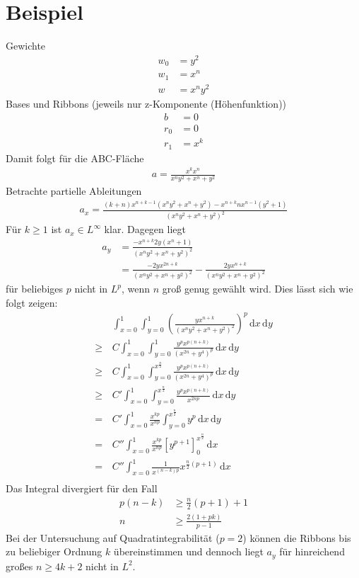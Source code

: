 \documentclass[10pt,a4paper]{report}
\author{Ludwig Paul Lind}
\begin{document}
\chapter{Beispiel}
Gewichte
\begin{align*}
w_0 &= y^2 \\
w_1 &= x^n \\
w &= x^n y^2
\end{align*}
Bases und Ribbons (jeweils nur z-Komponente (Höhenfunktion))
\begin{align*}
b &= 0 \\
r_0 &= 0 \\
r_1 &= x^k
\end{align*}
Damit folgt für die ABC-Fläche
\begin{align*}
a = \frac{x^k x^n}{x^n y^2 + x^n + y^2}
\end{align*}
Betrachte partielle Ableitungen
\begin{align*}
a_x = \frac{\left(k+n\right) x^{n+k-1} \left( x^ny^2+x^n+y^2\right) - x^{n+k} n x^{n-1} \left(y^2 + 1\right)}{\left(x^ny^2+x^n+y^2\right)^2}
\end{align*}
Für $k \geq 1$ ist $a_x \in L^{\infty}$ klar.
Dagegen liegt 
\begin{align*}
a_y &= \frac{-x^{n+k} 2 y \left(x^n + 1\right)}{\left(x^ny^2+x^n+y^2\right)^2} \\
&=  \frac{-2yx^{2n+k}}{\left(x^ny^2+x^n+y^2\right)^2} - \frac{2yx^{n+k}}{\left(x^ny^2+x^n+y^2\right)^2}
\end{align*}
für beliebiges $p$ nicht in $L^p$, wenn $n$ groß genug gewählt wird.
Dies lässt sich wie folgt zeigen:
\begin{align*}
&\int_{x=0}^{1} \int_{y=0}^{1} \left( \frac{yx^{n+k}}{\left(x^ny^2+x^n+y^2\right)^2} \right)^p \, \mathrm{d}x \, \mathrm{d}y \\
\geq \, &C \int_{x=0}^{1} \int_{y=0}^{1}  \frac{y^px^{p\left(n+k\right)}}{\left(x^{2n}+y^4\right)^p}  \, \mathrm{d}x \, \mathrm{d}y \\
\geq \, &C \int_{x=0}^{1} \int_{y=0}^{x^{\frac{n}{2}}}  \frac{y^px^{p\left(n+k\right)}}{\left(x^{2n}+y^4\right)^p}  \, \mathrm{d}x \, \mathrm{d}y \\
\geq \, &C' \int_{x=0}^{1} \int_{y=0}^{x^{\frac{n}{2}}}  \frac{y^px^{p\left(n+k\right)}}{x^{2np}}  \, \mathrm{d}x \, \mathrm{d}y \\
= \, &C' \int_{x=0}^{1} \frac{x^{kp}}{x^{np}} \int_{y=0}^{x^{\frac{n}{2}}} y^p  \, \mathrm{d}x \, \mathrm{d}y \\
= \, &C'' \int_{x=0}^{1} \frac{x^{kp}}{x^{np}} \left[y^{p+1}\right]_{0}^{x^{\frac{n}{2}}} \, \mathrm{d}x\\
= \, &C'' \int_{x=0}^{1} \frac{1}{x^{\left(n-k\right)p}} x^{\frac{n}{2}\left(p+1\right)} \, \mathrm{d}x\\
\end{align*}
Das Integral divergiert für den Fall
\begin{align*}
p \left(n - k\right) &\geq \frac{n}{2}\left(p+1\right) + 1 \\
n &\geq \frac{2 \left(1+pk\right)}{p-1}
\end{align*}
Bei der Untersuchung auf Quadratintegrabilität ($p=2$) können die Ribbons bis zu beliebiger Ordnung $k$ übereinstimmen und dennoch liegt $a_y$ für hinreichend großes $n \geq 4k+2$ nicht in $L^2$.
\end{document}
